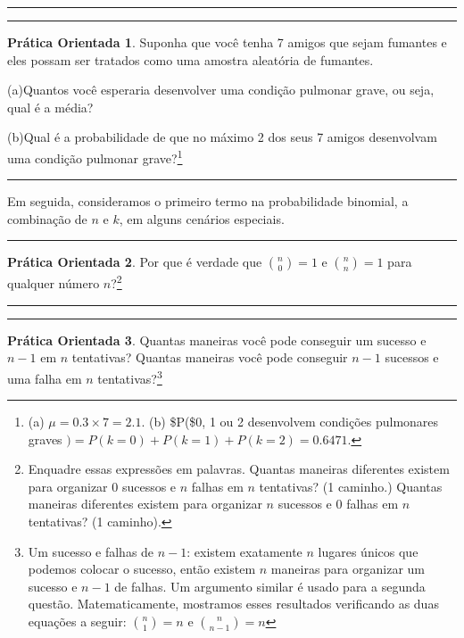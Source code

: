 \documentclass[
]{book}
\theoremstyle{definition}
\theoremstyle{definition}
\theoremstyle{definition}
\newtheorem{exercise}{Prática Orientada}[chapter]
\theoremstyle{definition}
\theoremstyle{remark}
\begin{document}
\begin{center}\rule{0.5\linewidth}{0.5pt}\end{center}

\begin{center}\rule{0.5\linewidth}{0.5pt}\end{center}

\begin{exercise}
\protect\hypertarget{exr:unnamed-chunk-134}{}{\label{exr:unnamed-chunk-134} }Suponha que você tenha 7 amigos que sejam fumantes e eles possam ser tratados como uma amostra aleatória de fumantes.

(a)Quantos você esperaria desenvolver uma condição pulmonar grave, ou seja, qual é a média?

(b)Qual é a probabilidade de que no máximo 2 dos seus 7 amigos desenvolvam uma condição pulmonar grave?\footnote{(a) \(\mu=0.3\times7 = 2.1\). (b) \$P(\$0, 1 ou 2 desenvolvem condições pulmonares graves \() = P(k=0) + P(k=1)+P(k=2) = 0.6471\).}
\end{exercise}

\begin{center}\rule{0.5\linewidth}{0.5pt}\end{center}

Em seguida, consideramos o primeiro termo na probabilidade binomial, a combinação de \(n\) e \(k\), em alguns cenários especiais.

\begin{center}\rule{0.5\linewidth}{0.5pt}\end{center}

\begin{exercise}
\protect\hypertarget{exr:unnamed-chunk-135}{}{\label{exr:unnamed-chunk-135} }Por que é verdade que \({n \choose 0}=1\) e \({n \choose n}=1\) para qualquer número \(n\)?\footnote{Enquadre essas expressões em palavras. Quantas maneiras diferentes existem para organizar 0 sucessos e \(n\) falhas em \(n\) tentativas? (1 caminho.) Quantas maneiras diferentes existem para organizar \(n\) sucessos e 0 falhas em \(n\) tentativas? (1 caminho).}
\end{exercise}

\begin{center}\rule{0.5\linewidth}{0.5pt}\end{center}

\begin{center}\rule{0.5\linewidth}{0.5pt}\end{center}

\begin{exercise}
\protect\hypertarget{exr:unnamed-chunk-136}{}{\label{exr:unnamed-chunk-136} }Quantas maneiras você pode conseguir um sucesso e \(n-1\) em \(n\) tentativas? Quantas maneiras você pode conseguir \(n-1\) sucessos e uma falha em \(n\) tentativas?\footnote{Um sucesso e falhas de \(n-1\): existem exatamente \(n\) lugares únicos que podemos colocar o sucesso, então existem \(n\) maneiras para organizar um sucesso e \(n-1\) de falhas. Um argumento similar é usado para a segunda questão. Matematicamente, mostramos esses resultados verificando as duas equações a seguir: \({n \choose 1} = n\) e \({n \choose n-1} = n\)}
\end{exercise}
\end{document}
